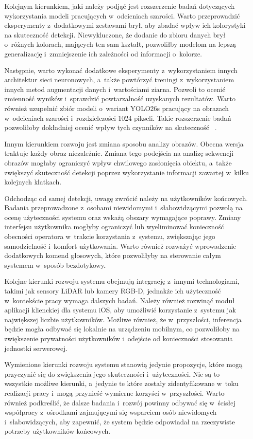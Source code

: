 Kolejnym kierunkiem, jaki należy podjąć jest rozszerzenie badań dotyczących wykorzystania modeli pracujących w~odcieniach szarości. Warto przeprowadzić eksperymenty z~dodatkowymi zestawami brył, aby zbadać wpływ ich kolorystyki na skuteczność detekcji. Niewykluczone, że dodanie do zbioru danych brył o~różnych kolorach, mających ten sam kształt, pozwoliłby modelom na lepszą generalizację i~zmniejszenie ich zależności od informacji o~kolorze.

Następnie, warto wykonać dodatkowe eksperymenty z~wykorzystaniem innych architektur sieci neuronowych, a~także powtórzyć treningi z~wykorzystaniem innych metod augmentacji danych i~wartościami ziarna. Pozwoli to ocenić zmienność wyników i~sprawdzić powtarzalność uzyskanych rezultatów. Warto również uzupełnić zbiór modeli o~wariant YOLO26s pracujący na obrazach w~odcieniach szarości i~rozdzielczości 1024 pikseli. Takie rozszerzenie badań pozwoliłoby dokładniej ocenić wpływ tych czynników na skuteczność ~.

Innym kierunkiem rozwoju jest zmiana sposobu analizy obrazów. Obecna wersja traktuje każdy obraz niezależnie. Zmiana tego podejścia na analizę sekwencji obrazów mogłaby ograniczyć wpływ chwilowego zasłonięcia obiektu, a~także zwiększyć skuteczność detekcji poprzez wykorzystanie informacji zawartej w~kilku kolejnych klatkach.

Odchodząc od samej detekcji, uwagę zwrócić należy na użytkowników końcowych. Badania przeprowadzone z~osobami niewidomymi i~słabowidzącymi pozwolą na ocenę użyteczności systemu oraz wskażą obszary wymagające poprawy. Zmiany interfejsu użytkownika mogłyby ograniczyć lub wyeliminować konieczność obecności operatora w~trakcie korzystania z~systemu, zwiększając jego samodzielność i~komfort użytkowania. Warto również rozważyć wprowadzenie dodatkowych komend głosowych, które pozwoliłyby na sterowanie całym systemem w~sposób bezdotykowy.

Kolejne kierunki rozwoju systemu obejmują integrację z~innymi technologiami, takimi jak sensory LiDAR lub kamery RGB-D, jednakże ich użyteczność w~kontekście pracy wymaga dalszych badań. Należy również rozwinąć moduł aplikacji klienckiej dla systemu iOS, aby umożliwić korzystanie z~systemu jak największej liczbie użytkowników. Możliwe również, że w~przyszłości, inferencja będzie mogła odbywać się lokalnie na urządzeniu mobilnym, co pozwoliłoby na zwiększenie prywatności użytkowników i~odejście od konieczności stosowania jednostki serwerowej.

Wymienione kierunki rozwoju systemu stanowią jedynie propozycje, które mogą przyczynić się do zwiększenia jego skuteczności i~użyteczności. Nie są to wszystkie możliwe kierunki, a~jedynie te które zostały zidentyfikowane w~toku realizacji pracy i~mogą przynieść wymierne korzyści w~przyszłości. Warto również podkreślić, że dalsze badania i~rozwój powinny odbywać się w~ścisłej współpracy z~ośrodkami zajmującymi się wsparciem osób niewidomych i~słabowidzących, aby zapewnić, że system będzie odpowiadał na rzeczywiste potrzeby użytkowników końcowych.